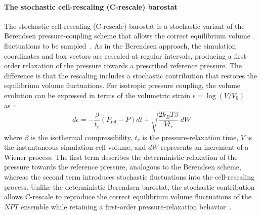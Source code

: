 \paragraph{The stochastic cell-rescaling (C-rescale) barostat}
The stochastic cell-rescaling (C-rescale) barostat is a stochastic variant of the Berendsen pressure-coupling scheme that allows the correct equilibrium volume fluctuations to be sampled~\cite{CRB}. As in the Berendsen approach, the simulation coordinates and box vectors are rescaled at regular intervals, producing a first-order relaxation of the pressure towards a prescribed reference pressure. The difference is that the rescaling includes a stochastic contribution that restores the equilibrium volume fluctuations.
For isotropic pressure coupling, the volume evolution can be expressed in terms of the volumetric strain $\epsilon=\log(V/V_0)$ as~\cite{CRB,Gromacs2015}:
\begin{equation}\label{eq:crescale}
d\epsilon
=
-\frac{\beta}{t_r}
\left(
P_{\mathrm{ref}}-P
\right)dt
+
\sqrt{
\frac{2k_BT\beta}{Vt_r}
}\,dW
\end{equation}
where $\beta$ is the isothermal compressibility, $t_r$ is the pressure-relaxation time, $V$ is the instantaneous simulation-cell volume, and $dW$ represents an increment of a Wiener process. The first term describes the deterministic relaxation of the pressure towards the reference pressure, analogous to the Berendsen scheme, whereas the second term introduces stochastic fluctuations into the cell-rescaling process.
Unlike the deterministic Berendsen barostat, the stochastic contribution allows C-rescale to reproduce the correct equilibrium volume fluctuations of the $NPT$ ensemble while retaining a first-order pressure-relaxation behavior~\cite{CRB}.


